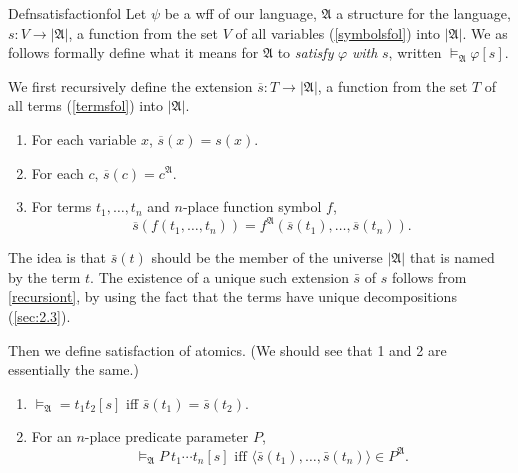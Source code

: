 \begin{reference}{Defn}{satisfactionfol}
  Let $\psi$ be a wff of our language, $\mathfrak{A}$ a structure for the language, $s:V\rightarrow\left|\mathfrak{A}\right|$, a function from the set $V$ of all variables (\ref{symbolsfol}) into $\left|\mathfrak{A}\right|$. We as follows formally define what it means for $\mathfrak{A}$ to \textit{satisfy} $\varphi$ \textit{with} $s$, written $\vDash_{\mathfrak{A}}\varphi[s]$.

  We first recursively define the extension $\overline{s}:T \rightarrow \left|\mathfrak{A}\right|$, a function from the set $T$ of all terms (\ref{termsfol}) into $\left|\mathfrak{A}\right|$.
  \begin{enumerate}
    \item For each variable $x$, $\overline{s}(x)=s(x)$.
    \item For each $c$, $\overline{s}(c)=c^{\mathfrak{A}}$.
    \item For terms $t_1,\dots,t_n$ and $n$-place function symbol $f$,
          \[\overline{s}(f(t_1,\dots,t_n))=f^{\mathfrak{A}}(\overline{s}(t_1),\dots,\overline{s}(t_n)).\]
  \end{enumerate}
  The idea is that $\bar{s}(t)$ should be the member of the universe $|\mathfrak{A}|$ that is named by the term $t$. The existence of a unique such extension $\bar{s}$ of $s$ follows from \ref{recursiont}, by using the fact that the terms have unique decompositions (\ref{sec:2.3}).

  Then we define satisfaction of atomics. (We should see that 1 and 2 are essentially the same.)
  \begin{enumerate}
    \item $\vDash_{\mathfrak{A}}=t_1t_2[s]$ iff $\bar{s}(t_1)=\bar{s}(t_2)$.
    \item For an $n$-place predicate parameter $P$,
          \[
            \vDash_{\mathfrak{A}}P\ t_1\cdots t_n[s]\text{ iff }\langle\bar{s}(t_1),\dots,\bar{s}(t_n)\rangle\in P^{\mathfrak{A}}.
          \]
  \end{enumerate}


\end{reference}
